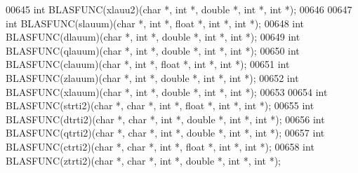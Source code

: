\begin{DoxyCode}
00645 \textcolor{keywordtype}{int} BLASFUNC(xlauu2)(\textcolor{keywordtype}{char} *, \textcolor{keywordtype}{int} *, \textcolor{keywordtype}{double} *, \textcolor{keywordtype}{int} *, \textcolor{keywordtype}{int} *);
00646 
00647 \textcolor{keywordtype}{int} BLASFUNC(slauum)(\textcolor{keywordtype}{char} *, \textcolor{keywordtype}{int} *, \textcolor{keywordtype}{float}  *, \textcolor{keywordtype}{int} *, \textcolor{keywordtype}{int} *);
00648 \textcolor{keywordtype}{int} BLASFUNC(dlauum)(\textcolor{keywordtype}{char} *, \textcolor{keywordtype}{int} *, \textcolor{keywordtype}{double} *, \textcolor{keywordtype}{int} *, \textcolor{keywordtype}{int} *);
00649 \textcolor{keywordtype}{int} BLASFUNC(qlauum)(\textcolor{keywordtype}{char} *, \textcolor{keywordtype}{int} *, \textcolor{keywordtype}{double} *, \textcolor{keywordtype}{int} *, \textcolor{keywordtype}{int} *);
00650 \textcolor{keywordtype}{int} BLASFUNC(clauum)(\textcolor{keywordtype}{char} *, \textcolor{keywordtype}{int} *, \textcolor{keywordtype}{float}  *, \textcolor{keywordtype}{int} *, \textcolor{keywordtype}{int} *);
00651 \textcolor{keywordtype}{int} BLASFUNC(zlauum)(\textcolor{keywordtype}{char} *, \textcolor{keywordtype}{int} *, \textcolor{keywordtype}{double} *, \textcolor{keywordtype}{int} *, \textcolor{keywordtype}{int} *);
00652 \textcolor{keywordtype}{int} BLASFUNC(xlauum)(\textcolor{keywordtype}{char} *, \textcolor{keywordtype}{int} *, \textcolor{keywordtype}{double} *, \textcolor{keywordtype}{int} *, \textcolor{keywordtype}{int} *);
00653 
00654 \textcolor{keywordtype}{int} BLASFUNC(strti2)(\textcolor{keywordtype}{char} *, \textcolor{keywordtype}{char} *, \textcolor{keywordtype}{int} *, \textcolor{keywordtype}{float}  *, \textcolor{keywordtype}{int} *, \textcolor{keywordtype}{int} *);
00655 \textcolor{keywordtype}{int} BLASFUNC(dtrti2)(\textcolor{keywordtype}{char} *, \textcolor{keywordtype}{char} *, \textcolor{keywordtype}{int} *, \textcolor{keywordtype}{double} *, \textcolor{keywordtype}{int} *, \textcolor{keywordtype}{int} *);
00656 \textcolor{keywordtype}{int} BLASFUNC(qtrti2)(\textcolor{keywordtype}{char} *, \textcolor{keywordtype}{char} *, \textcolor{keywordtype}{int} *, \textcolor{keywordtype}{double} *, \textcolor{keywordtype}{int} *, \textcolor{keywordtype}{int} *);
00657 \textcolor{keywordtype}{int} BLASFUNC(ctrti2)(\textcolor{keywordtype}{char} *, \textcolor{keywordtype}{char} *, \textcolor{keywordtype}{int} *, \textcolor{keywordtype}{float}  *, \textcolor{keywordtype}{int} *, \textcolor{keywordtype}{int} *);
00658 \textcolor{keywordtype}{int} BLASFUNC(ztrti2)(\textcolor{keywordtype}{char} *, \textcolor{keywordtype}{char} *, \textcolor{keywordtype}{int} *, \textcolor{keywordtype}{double} *, \textcolor{keywordtype}{int} *, \textcolor{keywordtype}{int} *);

\end{DoxyCode}
